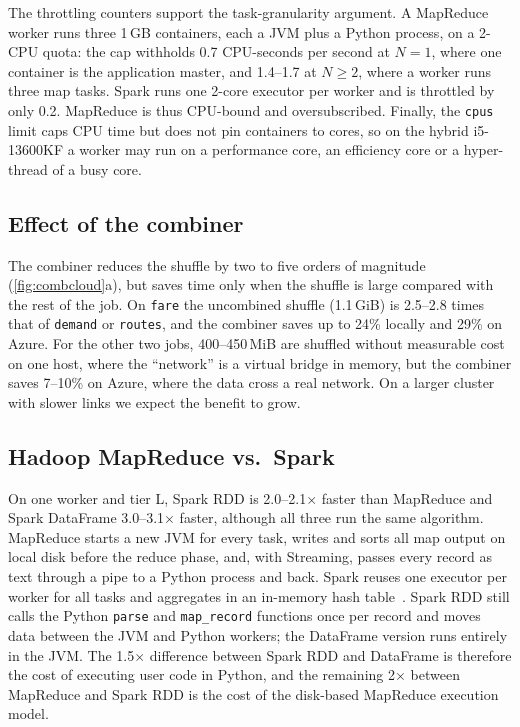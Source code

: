 The throttling counters support the task-granularity argument. A MapReduce worker runs
three 1\,GB containers, each a JVM plus a Python process, on a 2-CPU quota: the cap
withholds 0.7 CPU-seconds per second at $N=1$, where one container is the application
master, and 1.4--1.7 at $N\ge2$, where a worker runs three map tasks. Spark runs one
2-core executor per worker and is throttled by only 0.2. MapReduce is thus CPU-bound
and oversubscribed. Finally, the \texttt{cpus} limit caps CPU time but does not pin
containers to cores, so on the hybrid i5-13600KF a worker may run on a performance core,
an efficiency core or a hyper-thread of a busy core.

\subsection{Effect of the combiner}
The combiner reduces the shuffle by two to five orders of magnitude
(\cref{fig:combcloud}a), but saves time only when the shuffle is large compared with
the rest of the job. On \texttt{fare} the uncombined shuffle (1.1\,GiB) is 2.5--2.8
times that of \texttt{demand} or \texttt{routes}, and the combiner saves up to 24\%
locally and 29\% on Azure. For the other two jobs, 400--450\,MiB are shuffled without measurable
cost on one host, where the ``network'' is a virtual bridge in memory, but the combiner
saves 7--10\% on Azure, where the data cross a real network. On a larger cluster with
slower links we expect the benefit to grow.

\subsection{Hadoop MapReduce vs.\ Spark}
On one worker and tier L, Spark RDD is 2.0--2.1$\times$ faster than MapReduce and Spark
DataFrame 3.0--3.1$\times$ faster, although all three run the same algorithm. MapReduce
starts a new JVM for every task, writes and sorts all map output on local disk before
the reduce phase, and, with Streaming, passes every record as text through a pipe to a
Python process and back. Spark reuses one executor per worker for all tasks and
aggregates in an in-memory hash table~\cite{zaharia2012rdd}. Spark RDD still calls the
Python \texttt{parse} and \texttt{map\_record} functions once per record and moves data
between the JVM and Python workers; the DataFrame version runs entirely in the JVM.
The 1.5$\times$ difference between Spark RDD and DataFrame is therefore the cost of
executing user code in Python, and the remaining 2$\times$ between MapReduce and Spark
RDD is the cost of the disk-based MapReduce execution model.

